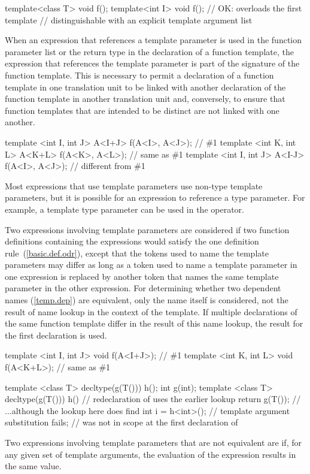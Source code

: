 \begin{codeblock}
template<class T> void f();
template<int I> void f();       // OK: overloads the first template
                                // distinguishable with an explicit template argument list
\end{codeblock}
\exitnote

\pnum
When an expression that references a template parameter is used in the
function parameter list or the return type in the declaration of a
function template, the expression that references the template
parameter is part of the signature of the function template.
This is
necessary to permit a declaration of a function template in one
translation unit to be linked with another declaration of the function
template in another translation unit and, conversely, to ensure that
function templates that are intended to be distinct are not linked
with one another.
\enterexample

\begin{codeblock}
template <int I, int J> A<I+J> f(A<I>, A<J>);   // \#1
template <int K, int L> A<K+L> f(A<K>, A<L>);   // same as \#1
template <int I, int J> A<I-J> f(A<I>, A<J>);   // different from \#1
\end{codeblock}
\exitexample
\enternote
Most expressions that use template parameters use non-type template
parameters, but it is possible for an expression to reference a type
parameter.
For example, a template type parameter can be used in the
 operator.
\exitnote

\pnum
Two expressions involving template parameters are considered
if two function definitions containing the expressions would satisfy
the one definition rule~(\ref{basic.def.odr}), except that the tokens used
to name the template parameters may differ as long as a token used to
name a template parameter in one expression is replaced by another token
that names the same template parameter in the other expression. For
determining whether two dependent names (\ref{temp.dep}) are
equivalent, only the name itself is considered, not the result of name
lookup in the context of the template. If multiple declarations of the
same function template differ in the result of this name lookup, the
result for the first declaration is used.
\enterexample

\begin{codeblock}
template <int I, int J> void f(A<I+J>);         // \#1
template <int K, int L> void f(A<K+L>);         // same as \#1

template <class T> decltype(g(T())) h();
int g(int);
template <class T> decltype(g(T())) h()         // redeclaration of  uses the earlier lookup
  { return g(T()); }                            // ...although the lookup here does find 
int i = h<int>();                               // template argument substitution fails; 
                                                // was not in scope at the first declaration of 
\end{codeblock}
\exitexample
Two expressions involving template parameters that are not equivalent are
if, for any given set of template arguments, the evaluation of the
expression results in the same value.

